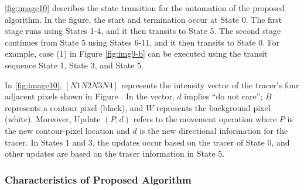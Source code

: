 
\ref{fig:image10} describes the state transition for the automation of the proposed algorithm. In the figure, the start and termination occur at State 0. The first stage runs using States 1-4, and it then transits to State 5. The second stage continues from State 5 using States 6-11, and it then transits to State 0. For example, case (1) in Figure \ref{fig:img9-b} can be executed using the transit sequence State 1, State 3, and State 5.


In \ref{fig:image10}, $[N1 N2 N3 N4]$ represents the intensity vector of the tracer's four adjacent pixels shown in Figure . In the vector, $d$ implies ``do not care''; $B$ represents a contour pixel (black), and $W$ represents the background pixel (white). Moreover, Update $(P,d)$ refers to the movement operation where $P$ is the new contour-pixel location and $d$ is the new directional information for the tracer. In States 1 and 3, the updates occur based on the tracer of State 0, and other updates are based on the tracer information in State 5.

\subsubsection{Characteristics of Proposed Algorithm}

